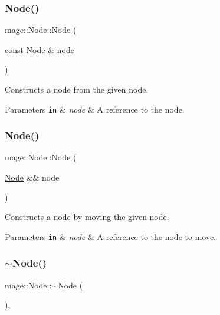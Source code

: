 \subsubsection{\texorpdfstring{Node()}{Node()}\hspace{0.1cm}{\footnotesize\ttfamily [2/3]}}
{\footnotesize\ttfamily mage\+::\+Node\+::\+Node (\begin{DoxyParamCaption}\item[{const \hyperlink{classmage_1_1_node}{Node} \&}]{node }\end{DoxyParamCaption})}

Constructs a node from the given node.


\begin{DoxyParams}[1]{Parameters}
\mbox{\tt in}  & {\em node} & A reference to the node. \\
\hline
\end{DoxyParams}
\hypertarget{classmage_1_1_node_a848ecb05c6b085cb4f27e38add85e64c}{}\label{classmage_1_1_node_a848ecb05c6b085cb4f27e38add85e64c} 
\subsubsection{\texorpdfstring{Node()}{Node()}\hspace{0.1cm}{\footnotesize\ttfamily [3/3]}}
{\footnotesize\ttfamily mage\+::\+Node\+::\+Node (\begin{DoxyParamCaption}\item[{\hyperlink{classmage_1_1_node}{Node} \&\&}]{node }\end{DoxyParamCaption})\hspace{0.3cm}{\ttfamily [noexcept]}}

Constructs a node by moving the given node.


\begin{DoxyParams}[1]{Parameters}
\mbox{\tt in}  & {\em node} & A reference to the node to move. \\
\hline
\end{DoxyParams}
\hypertarget{classmage_1_1_node_a1369fc11b331abacbaf11aeb5729e871}{}\label{classmage_1_1_node_a1369fc11b331abacbaf11aeb5729e871} 
\subsubsection{\texorpdfstring{$\sim$\+Node()}{~Node()}}
{\footnotesize\ttfamily mage\+::\+Node\+::$\sim$\+Node (\begin{DoxyParamCaption}{ }\end{DoxyParamCaption})\hspace{0.3cm}{\ttfamily [virtual]}, {\ttfamily [default]}}

